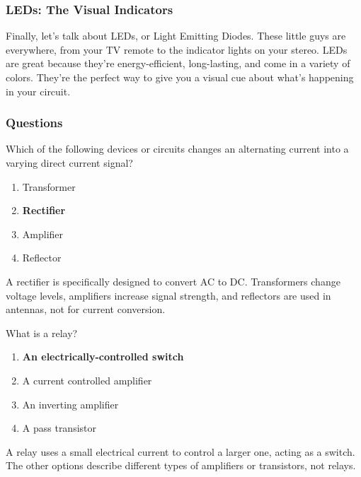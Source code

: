 \subsubsection*{LEDs: The Visual Indicators}
Finally, let's talk about LEDs, or Light Emitting Diodes. These little guys are everywhere, from your TV remote to the indicator lights on your stereo. LEDs are great because they’re energy-efficient, long-lasting, and come in a variety of colors. They’re the perfect way to give you a visual cue about what’s happening in your circuit.





\subsubsection{Questions}

\begin{tcolorbox}[colback=gray!10!white,colframe=black!75!black,title={T6D01}]
Which of the following devices or circuits changes an alternating current into a varying direct current signal?
\begin{enumerate}[label=\Alph*),noitemsep]
    \item Transformer
    \item \textbf{Rectifier}
    \item Amplifier
    \item Reflector
\end{enumerate}
\end{tcolorbox}
A rectifier is specifically designed to convert AC to DC. Transformers change voltage levels, amplifiers increase signal strength, and reflectors are used in antennas, not for current conversion.

\begin{tcolorbox}[colback=gray!10!white,colframe=black!75!black,title={T6D02}]
What is a relay?
\begin{enumerate}[label=\Alph*),noitemsep]
    \item \textbf{An electrically-controlled switch}
    \item A current controlled amplifier
    \item An inverting amplifier
    \item A pass transistor
\end{enumerate}
\end{tcolorbox}
A relay uses a small electrical current to control a larger one, acting as a switch. The other options describe different types of amplifiers or transistors, not relays.

